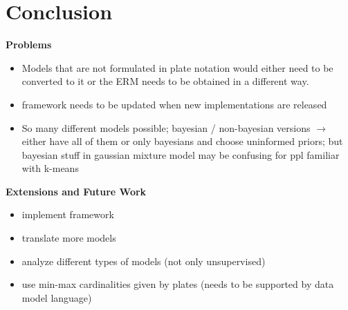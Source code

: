 \section{Conclusion}

\textbf{Problems}
\begin{itemize}
\item Models that are not formulated in plate notation would either need to be converted to it or the ERM needs to be obtained in a different way.
\item framework needs to be updated when new implementations are released
\item So many different models possible; bayesian / non-bayesian versions $\rightarrow$ either have all of them or only bayesians and choose uninformed priors; but bayesian stuff in gaussian mixture model may be confusing for ppl familiar with k-means
\end{itemize}

\textbf{Extensions and Future Work}
\begin{itemize}
\item implement framework
\item translate more models
\item analyze different types of models (not only unsupervised)
\item use min-max cardinalities given by plates (needs to be supported by data model language)
\end{itemize}
